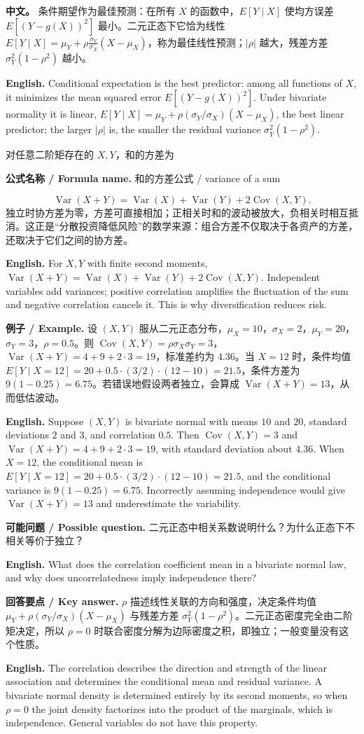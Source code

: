\documentclass[UTF8,11pt,a4paper]{ctexart}
\newcommand{\EN}[1]{\par\noindent\textbf{English.} #1\par}
\newcommand{\FORMULA}[2]{\par\noindent\textbf{公式名称 / Formula name.} #1 / #2\par}
\newcommand{\EX}[2]{\par\noindent\textbf{例子 / Example.} #1\par\EN{#2}}
\newcommand{\ASK}[4]{\par\noindent\textbf{可能问题 / Possible question.} #1\par\EN{#2}\noindent\textbf{回答要点 / Key answer.} #3\par\EN{#4}\medskip}
\newcommand{\APS}[2]{\par\noindent\textbf{中文。} #1\par\noindent\textbf{English.} #2\par\smallskip}
\begin{document}
\APS{条件期望作为最佳预测：在所有 $X$ 的函数中，$E[Y\mid X]$ 使均方误差 $E[(Y-g(X))^2]$ 最小。二元正态下它恰为线性 $E[Y\mid X]=\mu_Y+\rho\frac{\sigma_Y}{\sigma_X}(X-\mu_X)$，称为最佳线性预测；$|\rho|$ 越大，残差方差 $\sigma_Y^2(1-\rho^2)$ 越小。}{Conditional expectation is the best predictor: among all functions of $X$, it minimizes the mean squared error $E[(Y-g(X))^2]$. Under bivariate normality it is linear, $E[Y\mid X]=\mu_Y+\rho(\sigma_Y/\sigma_X)(X-\mu_X)$, the best linear predictor; the larger $|\rho|$ is, the smaller the residual variance $\sigma_Y^2(1-\rho^2)$.}

\noindent 对任意二阶矩存在的 $X,Y$，和的方差为
\FORMULA{和的方差公式}{variance of a sum}
\[
\operatorname{Var}(X+Y)=\operatorname{Var}(X)+\operatorname{Var}(Y)+2\operatorname{Cov}(X,Y).
\]
独立时协方差为零，方差可直接相加；正相关时和的波动被放大，负相关时相互抵消。这正是“分散投资降低风险”的数学来源：组合方差不仅取决于各资产的方差，还取决于它们之间的协方差。
\EN{For $X,Y$ with finite second moments, $\operatorname{Var}(X+Y)=\operatorname{Var}(X)+\operatorname{Var}(Y)+2\operatorname{Cov}(X,Y)$. Independent variables add variances; positive correlation amplifies the fluctuation of the sum and negative correlation cancels it. This is why diversification reduces risk.}

\EX{设 $(X,Y)$ 服从二元正态分布，$\mu_X=10$，$\sigma_X=2$，$\mu_Y=20$，$\sigma_Y=3$，$\rho=0.5$。则 $\operatorname{Cov}(X,Y)=\rho\sigma_X\sigma_Y=3$，$\operatorname{Var}(X+Y)=4+9+2\cdot3=19$，标准差约为 $4.36$。当 $X=12$ 时，条件均值 $E[Y\mid X=12]=20+0.5\cdot(3/2)\cdot(12-10)=21.5$，条件方差为 $9(1-0.25)=6.75$。若错误地假设两者独立，会算成 $\operatorname{Var}(X+Y)=13$，从而低估波动。}{Suppose $(X,Y)$ is bivariate normal with means $10$ and $20$, standard deviations $2$ and $3$, and correlation $0.5$. Then $\operatorname{Cov}(X,Y)=3$ and $\operatorname{Var}(X+Y)=4+9+2\cdot3=19$, with standard deviation about $4.36$. When $X=12$, the conditional mean is $E[Y\mid X=12]=20+0.5\cdot(3/2)\cdot(12-10)=21.5$, and the conditional variance is $9(1-0.25)=6.75$. Incorrectly assuming independence would give $\operatorname{Var}(X+Y)=13$ and underestimate the variability.}

\ASK{二元正态中相关系数说明什么？为什么正态下不相关等价于独立？}{What does the correlation coefficient mean in a bivariate normal law, and why does uncorrelatedness imply independence there?}{$\rho$ 描述线性关联的方向和强度，决定条件均值 $\mu_Y+\rho(\sigma_Y/\sigma_X)(X-\mu_X)$ 与残差方差 $\sigma_Y^2(1-\rho^2)$。二元正态密度完全由二阶矩决定，所以 $\rho=0$ 时联合密度分解为边际密度之积，即独立；一般变量没有这个性质。}{The correlation describes the direction and strength of the linear association and determines the conditional mean and residual variance. A bivariate normal density is determined entirely by its second moments, so when $\rho=0$ the joint density factorizes into the product of the marginals, which is independence. General variables do not have this property.}
\end{document}
